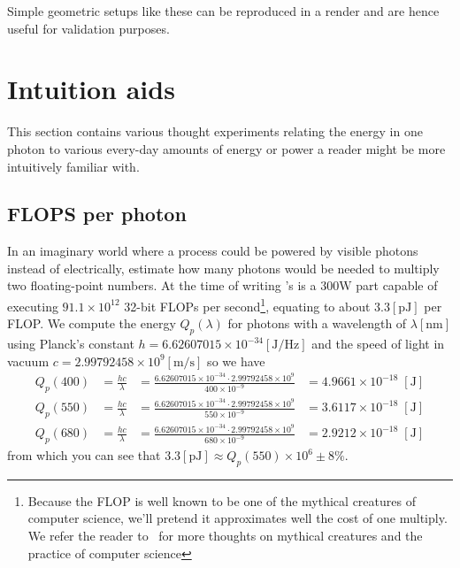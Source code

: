 Simple geometric setups like these can be reproduced in a render and are hence useful for validation purposes.

\section{Intuition aids}

This section contains various thought experiments relating the energy in one photon to 
various every-day amounts of energy or power a reader might be more intuitively familiar with.

\subsection{FLOPS per photon}\label{sec:energy_photon}

In an imaginary world where a process could be powered by visible photons instead of electrically,
estimate how many photons would be needed to multiply two floating-point numbers.
At the time of writing 's   is a 
$300 \unit{\watt}$ part capable of executing $91.1 \times 10^{12}$ 32-bit \glspl{FLOP} per 
second\footnote{
	Because the \gls{FLOP} is well known to be one of the mythical creatures of computer 
	science, we'll pretend it approximates well the cost of one multiply.
	We refer the reader to~\cite{brooks95} for more thoughts on mythical creatures and the 
	practice of computer science},
equating to about $3.3 [\unit{\pico\joule}]$ per \gls{FLOP}.
We compute the energy $Q_p(\lambda)$ for photons with a wavelength of $\lambda [\unit{\nano\meter}]$ 
using Planck's constant $h = 6.62607015 \times 10^{-34} [\unit{\joule\per\hertz}]$ 
and the speed of light in vacuum $c = 2.99792458 \times 10^{9}[\unit{\meter\per\second}]$ so we have
\begin{align}
	Q_p(400) &= \frac{hc}{\lambda} 
		&= \frac{6.62607015 \times 10^{-34} \cdot 2.99792458 \times 10^{9}}{400\times 10^{-9}}
	 	&= 4.9661 \times 10^{-18}\;[\unit{\joule}] \\
	Q_p(550) &= \frac{hc}{\lambda} 
		&= \frac{6.62607015 \times 10^{-34} \cdot 2.99792458 \times 10^{9}}{550\times 10^{-9}}
	 	&= 3.6117 \times 10^{-18}\;[\unit{\joule}] \\
	Q_p(680) &= \frac{hc}{\lambda} 
		&= \frac{6.62607015 \times 10^{-34} \cdot 2.99792458 \times 10^{9}}{680\times 10^{-9}}
	 	&= 2.9212 \times 10^{-18}\;[\unit{\joule}]
\end{align}
from which you can see that $3.3 [\unit{\pico\joule}] \approx Q_p(550) \times 10^{6} \pm 8\%$.



